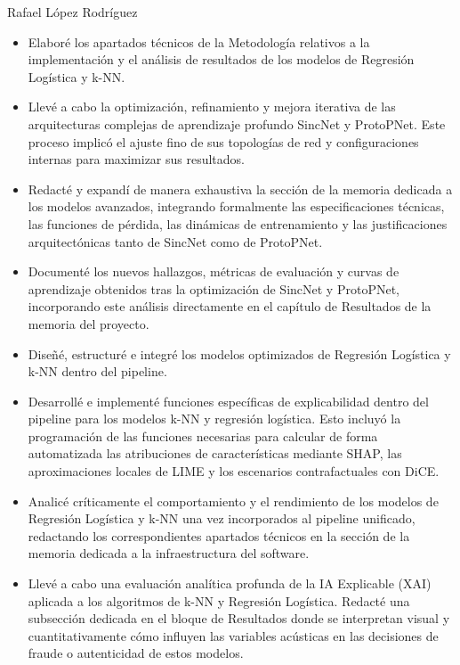 \begin{contribucion}{Rafael López Rodríguez}
\begin{itemize}
	\item Elaboré los apartados técnicos de la Metodología relativos a la implementación y el análisis de resultados de los modelos de Regresión Logística y k-NN.

	\item Llevé a cabo la optimización, refinamiento y mejora iterativa de las arquitecturas complejas de aprendizaje profundo SincNet y ProtoPNet. Este proceso implicó el ajuste fino de sus topologías de red y configuraciones internas para maximizar sus resultados.
	
	\item Redacté y expandí de manera exhaustiva la sección de la memoria dedicada a los modelos avanzados, integrando formalmente las especificaciones técnicas, las funciones de pérdida, las dinámicas de entrenamiento y las justificaciones arquitectónicas tanto de SincNet como de ProtoPNet.
	
	\item Documenté los nuevos hallazgos, métricas de evaluación y curvas de aprendizaje obtenidos tras la optimización de SincNet y ProtoPNet, incorporando este análisis directamente en el capítulo de Resultados de la memoria del proyecto.
	
	\item Diseñé, estructuré e integré los modelos optimizados de Regresión Logística y k-NN dentro del pipeline.
	
	\item Desarrollé e implementé funciones específicas de explicabilidad dentro del pipeline para los modelos k-NN y regresión logística. Esto incluyó la programación de las funciones necesarias para calcular de forma automatizada las atribuciones de características mediante SHAP, las aproximaciones locales de LIME y los escenarios contrafactuales con DiCE.
	
	\item Analicé críticamente el comportamiento y el rendimiento de los modelos de Regresión Logística y k-NN una vez incorporados al pipeline unificado, redactando los correspondientes apartados técnicos en la sección de la memoria dedicada a la infraestructura del software.
	
	\item Llevé a cabo una evaluación analítica profunda de la IA Explicable (XAI) aplicada a los algoritmos de k-NN y Regresión Logística. Redacté una subsección dedicada en el bloque de Resultados donde se interpretan visual y cuantitativamente cómo influyen las variables acústicas en las decisiones de fraude o autenticidad de estos modelos.
	

\end{itemize}
\end{contribucion}
